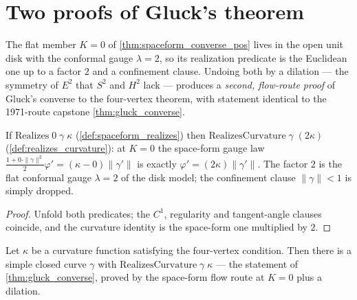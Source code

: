 \section{Two proofs of Gluck's theorem}
\label{sec:two_proofs}

The flat member $K=0$ of \cref{thm:spaceform_converse_pos} lives in
the open unit disk with the conformal gauge $\lambda=2$, so its realization
predicate is the Euclidean one up to a factor $2$ and a confinement clause.
Undoing both by a dilation — the symmetry of $E^2$ that $S^2$ and $H^2$ lack —
produces a \emph{second, flow-route proof} of Gluck's converse to the
four-vertex theorem, with statement identical to the 1971-route capstone
\cref{thm:gluck_converse}.

\begin{lemma}
  \label{lem:realizes_curvature_of_realizes_zero}
  If $\mathrm{Realizes}\;0\;\gamma\;\kappa$ (\cref{def:spaceform_realizes}) then
  $\mathrm{RealizesCurvature}\;\gamma\;(2\kappa)$
  (\cref{def:realizes_curvature}): at $K=0$ the space-form gauge law
  $\tfrac{1+0\cdot\|\gamma\|^2}{2}\varphi'=(\kappa-0)\|\gamma'\|$ is exactly
  $\varphi'=(2\kappa)\|\gamma'\|$. The factor $2$ is the flat conformal gauge
  $\lambda=2$ of the disk model; the confinement clause $\|\gamma\|<1$ is simply
  dropped.
\end{lemma}

\begin{proof}
  \leanok
  Unfold both predicates; the $C^1$, regularity and tangent-angle clauses
  coincide, and the curvature identity is the space-form one multiplied by
  $2$.
\end{proof}

\begin{theorem}
  \label{thm:gluck_converse_spaceForm}
  Let $\kappa$ be a curvature function satisfying the four-vertex condition.
  Then there is a simple closed curve $\gamma$ with
  $\mathrm{RealizesCurvature}\;\gamma\;\kappa$ — the statement of
  \cref{thm:gluck_converse}, proved by the space-form flow route at
  $K=0$ plus a dilation.
\end{theorem}

